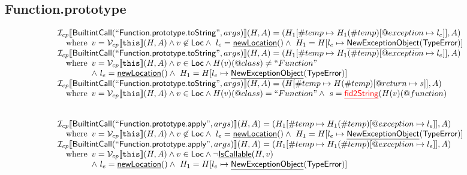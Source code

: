 \documentclass{article}
\makeatletter
\newcommand{\SF}[1]{\mbox{\textsf{#1}}}
\newcommand{\TT}[1]{\mbox{\texttt{#1}}}
\newcommand{\wherec}[1]{{\rm where}\begin{array}[t]{l}#1\end{array}}
\newcommand{\I}{\mathcal{I}}
\newcommand{\V}{\mathcal{V}}
\newcommand{\lbr}{\llbracket}
\newcommand{\rbr}{\rrbracket}
\newcommand{\hf}[1]{\underline{\sf #1}}
\newcommand{\varloc}[1]{\##1}
\newcommand{\varprop}[1]{@#1}
\def\inred{\color{red}}
\def\inred{\color{red}}
\makeatother
\begin{document}
\subsection{Function.prototype}
\[
\begin{array}{l}

\I _{cp}\lbr \SF{BuiltintCall}(``\SF{Function.prototype.toString}",args)\rbr(H,A)
 = (H_1[\varloc{temp}\mapsto H_1(\varloc{temp})[\varprop{exception}\mapsto l_e]], A) \\
\quad\wherec{
  v = \V _{cp}\lbr \TT{this}\rbr (H,A) \land v \not\in \SF{Loc}
  \land\ l_e = \hf{newLocation}() \land\ H_1=H[l_e\mapsto\hf{NewExceptionObject}(\SF{TypeError})] 
  }\\
  
\I _{cp}\lbr \SF{BuiltintCall}(``\SF{Function.prototype.toString}",args)\rbr(H,A)
 = (H_1[\varloc{temp}\mapsto H_1(\varloc{temp})[\varprop{exception}\mapsto l_e]], A) \\
\quad\wherec{
  v = \V _{cp}\lbr \TT{this}\rbr (H,A) \land v \in \SF{Loc} \land H(v)(@class) \neq ``Function"\\
  \land\ l_e = \hf{newLocation}() \land\ H_1=H[l_e\mapsto\hf{NewExceptionObject}(\SF{TypeError})] 
  }\\
  
\I _{cp}\lbr \SF{BuiltintCall}(``\SF{Function.prototype.toString}",args)\rbr(H,A)
 = (H[\varloc{temp}\mapsto H(\varloc{temp})[\varprop{return}\mapsto s]], A) \\
\quad\wherec{ 
  v = \V _{cp}\lbr \TT{this}\rbr (H,A) \land v \in \SF{Loc} \land H(v)(@class) = ``Function"
  \land\ s = \hf{\inred fid2String}(H(v)(\varprop{function})
  }\\
\\\\


\I _{cp}\lbr \SF{BuiltintCall}(``\SF{Function.prototype.apply}",args)\rbr(H,A)
 = (H_1[\varloc{temp}\mapsto H_1(\varloc{temp})[\varprop{exception}\mapsto l_e]], A) \\
\quad\wherec{
  v = \V _{cp}\lbr \TT{this}\rbr (H,A) \land v \not\in \SF{Loc}
  \land\ l_e = \hf{newLocation}() \land\ H_1=H[l_e\mapsto\hf{NewExceptionObject}(\SF{TypeError})] 
  }\\
  
\I _{cp}\lbr \SF{BuiltintCall}(``\SF{Function.prototype.apply}",args)\rbr(H,A)
 = (H_1[\varloc{temp}\mapsto H_1(\varloc{temp})[\varprop{exception}\mapsto l_e]], A) \\
\quad\wherec{
  v = \V _{cp}\lbr \TT{this}\rbr (H,A) \land v \in \SF{Loc} \land \neg \hf{IsCallable}(H,v)\\
  \land\ l_e = \hf{newLocation}() \land\ H_1=H[l_e\mapsto\hf{NewExceptionObject}(\SF{TypeError})] 
  }\\


\end{array}\]
\end{document}

